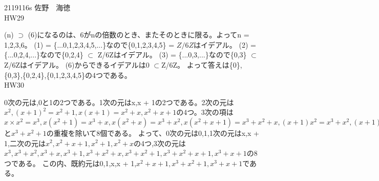 \documentclass[11pt]{jsarticle}
\begin{document}
2119116s 佐野　海徳\\
HW29
\par (n) $\supset$ (6)になるのは、6がnの倍数のとき、またそのときに限る。よってn = 1,2,3,6。 (1) = \{...0,1,2,3,4,5,...\}なので\{0,1,2,3,4,5\} = $Z / 6Z$はイデアル。
(2) = \{...0,2,4,...\}なので\{0,2,4\} $\subset$ Z/6Zはイデアル。 (3) = \{...0,3,...\}なので\{0,3\} $\subset$ Z/6Zはイデアル。 (6)からできるイデアルは{0} $\subset$Z/6Z。
よって答えは\{0\}, \{0,3\},\{0,2,4\},\{0,1,2,3,4,5\}の4つである。\\
HW30
\par 0次の元は,0と1の2つである。1次の元はx,x + 1の2つである。2次の元は$x^2,(x + 1)^2 = x^2 + 1,x(x + 1) = x^2 + x,x^2 + x + 1$の4つ。3次の項は$x \times x^2 = x^3,
x(x^2 + 1) = x^3 + x, x(x^2 + x) = x^3 + x^2,x(x^2 + x + 1) = x^3 + x^2 + x, (x + 1)x^2 = x^3 + x^2,(x + 1)(x^2 + 1) = x^3 + x^2 + x + 1,
(x + 1)(x^2 + x) = x^3 + 1$と$x^3 + x^2 + 1$の重複を除いて8個である。
よって、0次の元は0,1,1次の元はx,x + 1,二次の元は$x^2,x^2 + x + 1,x^2 + 1,x^2 + x$の4つ,3次の元は
$x^3,x^3+x^2,x^3+x,x^3+1,x^3+x^2+x,x^3+x^2+1,x^3+x^2+x+1,x^3 + x + 1$の8つである。
この内、既約元は0,1,x,x + 1,$x^2 + x + 1, x^3 + x^2 + 1,x^3 + x + 1$である。
\end{document}
